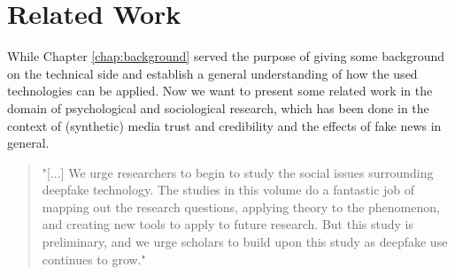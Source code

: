 \documentclass[
  a4paper,  %
  twoside,  %
  bibliography=totoc,
  headsepline,
  cleardoublepage=empty,
  parskip=half,
  draft=false
]{scrbook}
\begin{document}
\chapter{Related Work}
\label{chap:rel-work}
While Chapter \ref{chap:background} served the purpose of giving some background on the technical side and establish a general understanding of how the used technologies can be applied. Now we want to present some related work in the domain of psychological and sociological research, which has been done in the context of (synthetic) media trust and credibility and the effects of fake news in general. 

\begin{quotation}
  "[...] We urge researchers to begin to study the social issues surrounding deepfake technology. The studies in this volume do a fantastic job of mapping out the research questions, applying theory to the phenomenon, and creating new tools to apply to future research. But this study is preliminary, and we urge scholars to build upon this study as deepfake use continues to grow." \cite{hancockSocialImpactDeepfakes2021}
\end{quotation}
\end{document}
